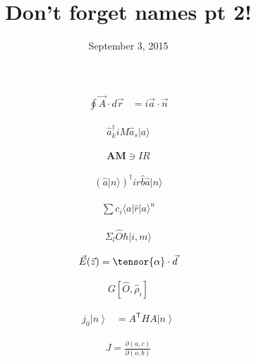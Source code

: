 \documentclass[twocolumn,pra,aps,superscriptaddress]{revtex4-1}
\newcommand{\bra}[1]{\langle{#1}|}
\newcommand{\ket}[1]{|{#1}\rangle}
\begin{document}
\title{Don't forget names pt 2!}
\author{}

\date{September 3, 2015} %
\begin{abstract}
\end{abstract}
\maketitle




\LARGE

\begin{align}
\oint \vec{A} \cdot d \vec{r} &= i \vec{a} \cdot \vec{n}
\end{align}

\begin{align}
\hat{a}^{\dagger}_k i M \hat{a}_s \ket{a}
\end{align}

\begin{align} %
\mathbf{AM} \ni IR
\end{align}

\begin{align} %
\left(\hat{a} \ket{n} \right)^{\dagger} i r  \hat{b} \hat{a} \ket{n}
\end{align}

\begin{align} %
\sum c_i \bra{a} \hat{r} \ket{a}^n
\end{align}

\begin{align} %
\Sigma_{l} \hat{O} \hbar \ket{i, m}
\end{align}

\begin{align} %
\vec{E}(\vec{z}) = \tensor{\alpha} \cdot \vec{d}
\end{align}

\begin{align} %
G\left[\hat{O}, \hat{\rho}_i \right]
\end{align}

\begin{align}
j_0\left\vert n\right\rangle&=A^\mathsf{T}HA\left\vert n\right\rangle
\end{align}

\begin{align}
J = \frac{\partial (a, c)}{\partial (o, b)}
\end{align}
\end{document}
